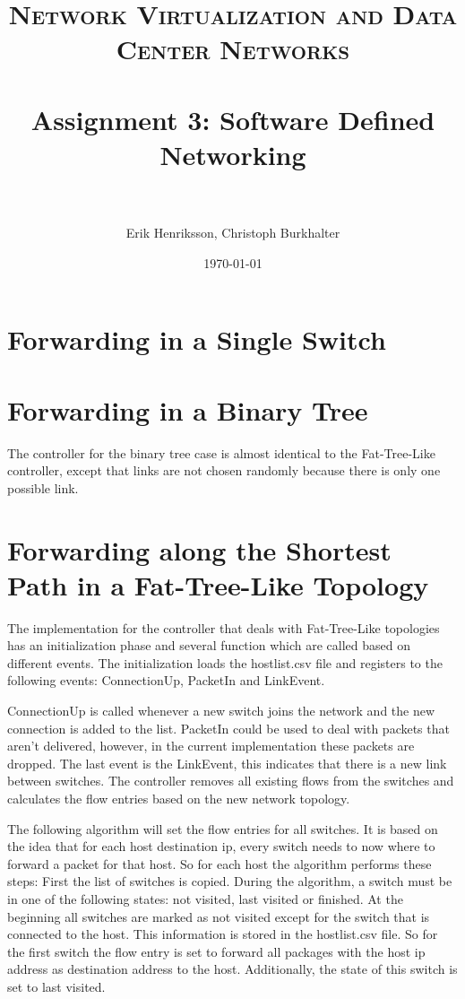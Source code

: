 \documentclass[paper=a4, fontsize=11pt]{scrartcl} %
\title{	
\normalfont \normalsize 
\textsc{Network Virtualization and Data Center Networks} \\ [25pt] %
\horrule{0.5pt} \\[0.4cm] %
\huge Assignment 3: Software Defined Networking\\ %
\horrule{2pt} \\[0.5cm] %
}
\author{Erik Henriksson, Christoph Burkhalter} %
\date{\normalsize\today} %
\numberwithin{equation}{section} %
\numberwithin{figure}{section} %
\numberwithin{table}{section} %
\begin{document}
\maketitle %

\section{Forwarding in a Single Switch}

\section{Forwarding in a Binary Tree}

The controller for the binary tree case is almost identical to the Fat-Tree-Like controller, except that links are not chosen randomly because there is only one possible link.

\section{Forwarding along the Shortest Path in a Fat-Tree-Like Topology}

The implementation for the controller that deals with Fat-Tree-Like topologies has an initialization phase and several function which are called based on different events. The initialization loads the hostlist.csv file and registers to the following events: ConnectionUp, PacketIn and LinkEvent.

ConnectionUp is called whenever a new switch joins the network and the new connection is added to the list. PacketIn could be used to deal with packets that aren't delivered, however, in the current implementation these packets are dropped. The last event is the LinkEvent, this indicates that there is a new link between switches. The controller removes all existing flows from the switches and calculates the flow entries based on the new network topology. 

The following algorithm will set the flow entries for all switches. It is based on the idea that for each host destination ip, every switch needs to now where to forward a packet for that host.
So for each host the algorithm performs these steps:
First the list of switches is copied. During the algorithm, a switch must be in one of the following states: not visited, last visited or finished. At the beginning all switches are marked as not visited except for the switch that is connected to the host. This information is stored in the hostlist.csv file. So for the first switch the flow entry is set to forward all packages with the host ip address as destination address to the host. Additionally, the state of this switch is set to last visited.
\end{document}
